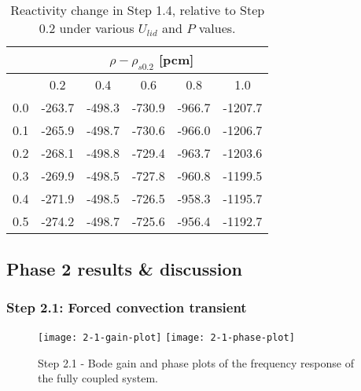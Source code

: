 \begin{table}[htbp!]
	\caption{Reactivity change in Step 1.4, relative to Step 0.2 under various
	$U_{lid}$ and $P$ values.}
	\centering
	\footnotesize
	\setlength\tabcolsep{1.5pt}
	\begin{tabular}{c c c c c c}
		\toprule
		& \multicolumn{5}{c}{$\rho - \rho_{s0.2}$ [pcm]} \\
		\midrule
		{\backslashbox{$U_{lid}$ [m$\cdot$s$^{-1}$]}{$P$ [GW]}} & 0.2 & 0.4 & 0.6 & 0.8 & 1.0 \\
		\midrule
		0.0 & -263.7 & -498.3 & -730.9 & -966.7 & -1207.7 \\
		0.1 & -265.9 & -498.7 & -730.6 & -966.0 & -1206.7 \\
		0.2 & -268.1 & -498.8 & -729.4 & -963.7 & -1203.6 \\
		0.3 & -269.9 & -498.5 & -727.8 & -960.8 & -1199.5 \\
		0.4 & -271.9 & -498.5 & -726.5 & -958.3 & -1195.7 \\
		0.5 & -274.2 & -498.7 & -725.6 & -956.4 & -1192.7 \\
		\bottomrule
	\end{tabular}
	\label{table:full}
\end{table}

\subsection{Phase 2 results \& discussion}

\subsubsection{Step 2.1: Forced convection transient}
%
\begin{figure*}[h!]
	\centering
	\texttt{[image: 2-1-gain-plot]}
	\texttt{[image: 2-1-phase-plot]}
	\caption{Step 2.1 - Bode gain and phase plots of the frequency response of
	the fully coupled system.}
	\label{fig:2.1}
\end{figure*}

